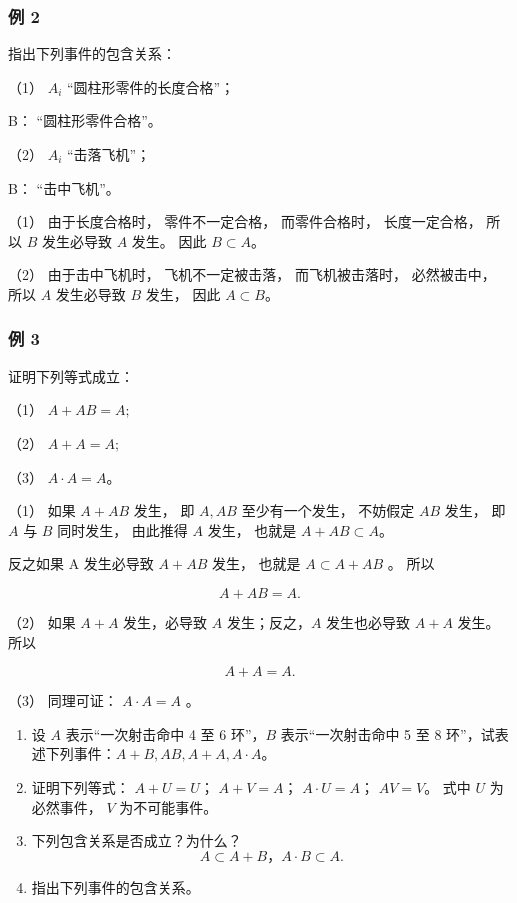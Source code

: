 \subsubsection{例 2}

指出下列事件的包含关系：

（1） \(A_{i}\) ``圆柱形零件的长度合格''；

B： ``圆柱形零件合格''。

（2） \(A_{i}\) ``击落飞机''；

B： ``击中飞机''。

 （1） 由于长度合格时， 零件不一定合格， 而零件合格时，
长度一定合格， 所以 \(B\) 发生必导致 \(A\) 发生。 因此 \(B \subset A\)。

（2） 由于击中飞机时， 飞机不一定被击落， 而飞机被击落时， 必然被击中，
所以 \(A\) 发生必导致 \(B\) 发生， 因此 \(A \subset B\)。

\subsubsection{例 3}

证明下列等式成立：

（1） \(A + AB = A;\)

（2） \(A + A = A;\)

（3） \(A \cdot A = A\)。

 （1） 如果 \(A + AB\) 发生， 即 \(A, AB\)
至少有一个发生， 不妨假定 \(AB\) 发生， 即 \(A\) 与 \(B\) 同时发生，
由此推得 \(A\) 发生， 也就是 \(A + AB \subset A\)。

反之如果 A 发生必导致 \(A + AB\) 发生， 也就是 \(A \subset A + AB\) 。
所以

\[
A + A B = A.
\]

（2） 如果 \(A+A\) 发生，必导致 \(A\) 发生；反之，\(A\) 发生也必导致
\(A+A\) 发生。所以

\[
A + A = A.
\]

（3） 同理可证： \(A \cdot A = A\) 。

\begin{enumerate}
\item
  设 \(A\) 表示``一次射击命中 4 至 6 环''，\(B\) 表示``一次射击命中 5 至
  8 环''，试表述下列事件：\(A + B, AB, A + A, A \cdot A\)。
\item
  证明下列等式： \(A+U=U\)； \(A + V = A\)； \(A \cdot U = A\)；
  \(A V = V\)。 式中 \(U\) 为必然事件， \(V\) 为不可能事件。
\item
  下列包含关系是否成立？为什么？
\[
A \subset A + B\text{，} A \cdot B \subset A.
\]
\item
  指出下列事件的包含关系。
\end{enumerate}

